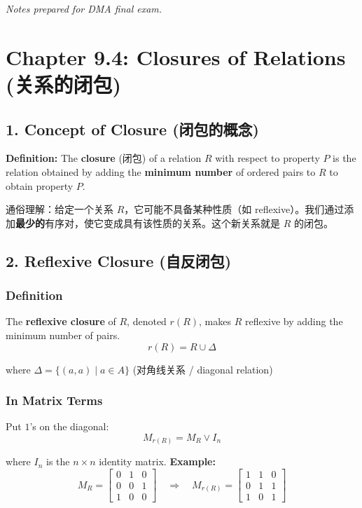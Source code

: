 \documentclass[10pt,a4paper,openany]{ctexbook}
\theoremstyle{definition}
\theoremstyle{remark}
\renewenvironment{quote}
  {\list{}{\leftmargin=1em\rightmargin=0pt\topsep=0.5pt\partopsep=0pt}\item[]}
  {\endlist}
\begin{document}
\vspace{-2pt}

\textit{Notes prepared for DMA final exam.}


\section{Chapter 9.4: Closures of Relations (关系的闭包)}

\vspace{-2pt}

\subsection{1. Concept of Closure (闭包的概念)}

\textbf{Definition:} The \textbf{closure} (闭包) of a relation $R$ with respect to property $P$ is the relation obtained by adding the \textbf{minimum number} of ordered pairs to $R$ to obtain property $P$.
\begin{quote}
通俗理解：给定一个关系 $R$，它可能不具备某种性质（如 reflexive）。我们通过添加\textbf{最少的}有序对，使它变成具有该性质的关系。这个新关系就是 $R$ 的闭包。

\end{quote}
\vspace{-2pt}

\subsection{2. Reflexive Closure (自反闭包)}

\subsubsection{Definition}

The \textbf{reflexive closure} of $R$, denoted $r(R)$, makes $R$ reflexive by adding the minimum number of pairs.
\[
r(R) = R \cup \Delta
\]

where $\Delta = \{(a, a) \mid a \in A\}$ (对角线关系 / diagonal relation)
\subsubsection{In Matrix Terms}

Put $1$'s on the diagonal:
\[
M_{r(R)} = M_R \lor I_n
\]

where $I_n$ is the $n \times n$ identity matrix.
\textbf{Example:}
\[
M_R = \begin{bmatrix}
0 & 1 & 0 \\
0 & 0 & 1 \\
1 & 0 & 0
\end{bmatrix}
\quad\Rightarrow\quad
M_{r(R)} = \begin{bmatrix}
1 & 1 & 0 \\
0 & 1 & 1 \\
1 & 0 & 1
\end{bmatrix}
\]
\end{document}
